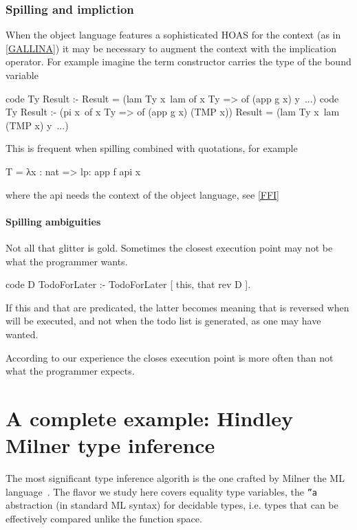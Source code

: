\documentclass[a4paper, 11pt]{book}
\begin{document}
\subsubsection{Spilling and impliction}

When the object language features a sophisticated HOAS for the context
(as in \cref{GALLINA}) it may be necessary to augment the context with
the implication operator. For example imagine the 
term constructor carries the type of the bound variable

\begin{elpicode}
  code Ty Result :- Result = (lam Ty x\ lam {of x Ty => of (app g x)} y\ ...)
  code Ty Result :-
    (pi x\ of x Ty => of (app g x) (TMP x))
    Result = (lam Ty x\ lam (TMP x) y\ ...)
\end{elpicode}

This is frequent when spilling combined with quotations, for example

\begin{elpicode}
  T = {{ λx : nat => lp:{{ app f {api x}  }}  }}
\end{elpicode}

where the api needs the context of the object language, see \cref{FFI}

\paragraph{Spilling ambiguities}

Not all that glitter is gold. Sometimes the closest execution
point may not be what the programmer wants.

\begin{elpicode}
  code D TodoForLater  :-
    TodoForLater [ this, that {rev D} ].
\end{elpicode}

If this and that are predicated, the latter becomes
 meaning that
 is reversed when  will be executed, and
not when the todo list is generated, as one may have wanted.

According to our experience the closes execution point
is more often than not what the programmer expects.

\section{A complete example: Hindley Milner type inference}\label{sec:milner}

The most significant type inference algorith is the one crafted by
Milner the ML language~\cite{MILNER1978348}. The flavor we 
study here covers equality type variables, the \texttt{''a} abstraction
(in standard ML syntax) for decidable types, i.e. types that can be
effectively compared unlike the function space.
\end{document}
